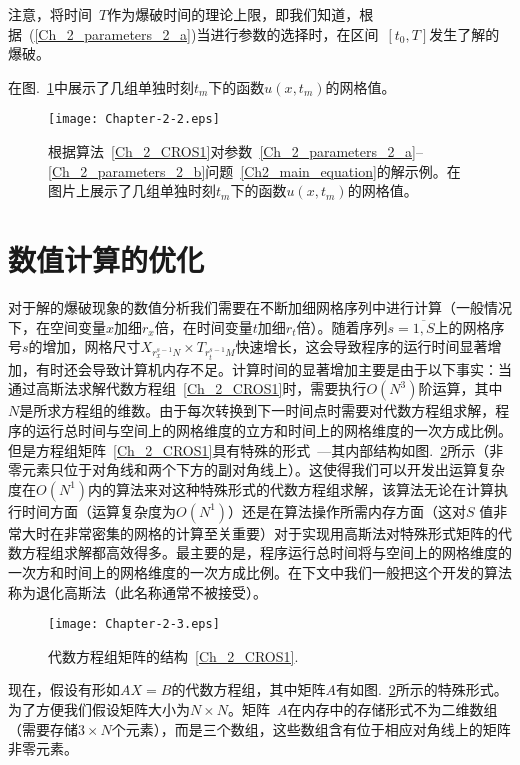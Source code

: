 \documentclass[twoside]{book}
\begin{document}
\begin{CJK*}{GBK}{song}
注意，将时间~$T$作为爆破时间的理论上限，即我们知道，根据~(\ref{Ch_2_parameters_2_a})当进行参数的选择时，在区间~$[t_0,T]$发生了解的爆破。

在图.~\ref{Fig_2_2}中展示了几组单独时刻$t_m$下的函数$u(x,t_m)$的网格值。
\begin{figure}[t]
    \centering
    \texttt{[image: Chapter-2-2.eps]}\\
    \caption{根据算法~\eqref{Ch_2_CROS1}对参数~\eqref{Ch_2_parameters_2_a}--\eqref{Ch_2_parameters_2_b}问题~\eqref{Ch2_main_equation}的解示例。在图片上展示了几组单独时刻$t_m$下的函数$u(x,t_m)$的网格值。}
    \label{Fig_2_2}
\end{figure}



\section{数值计算的优化}

对于解的爆破现象的数值分析我们需要在不断加细网格序列中进行计算（一般情况下，在空间变量$x$加细$r_x$倍，在时间变量$t$加细$r_t$倍）。随着序列$s = \overline{1,S}$上的网格序号$s$的增加，网格尺寸$X_{r_x^{s - 1}N} \times T_{r_t^{s - 1}M}$快速增长，这会导致程序的运行时间显著增加，有时还会导致计算机内存不足。计算时间的显著增加主要是由于以下事实：当通过高斯法求解代数方程组~\eqref{Ch_2_CROS1}时，需要执行$O(N^3)$阶运算，其中$N$是所求方程组的维数。由于每次转换到下一时间点时需要对代数方程组求解，程序的运行总时间与空间上的网格维度的立方和时间上的网格维度的一次方成比例。但是方程组矩阵~\eqref{Ch_2_CROS1}具有特殊的形式~---其内部结构如图.~\ref{Fig_2_3}所示（非零元素只位于对角线和两个下方的副对角线上）。这使得我们可以开发出运算复杂度在$O(N^1)$内的算法来对这种特殊形式的代数方程组求解，该算法无论在计算执行时间方面（运算复杂度为$O(N^1)$）还是在算法操作所需内存方面（这对$S$ 值非常大时在非常密集的网格的计算至关重要）对于实现用高斯法对特殊形式矩阵的代数方程组求解都高效得多。最主要的是，程序运行总时间将与空间上的网格维度的一次方和时间上的网格维度的一次方成比例。在下文中我们一般把这个开发的算法称为退化高斯法（此名称通常不被接受）。
\begin{figure}[t]
    \centering
    \texttt{[image: Chapter-2-3.eps]}\\
    \caption{代数方程组矩阵的结构~\eqref{Ch_2_CROS1}.}
    \label{Fig_2_3}
\end{figure}

\medskip

现在，假设有形如$AX = B$的代数方程组，其中矩阵$A$有如图.~\ref{Fig_2_3}所示的特殊形式。为了方便我们假设矩阵大小为$N \times N$。矩阵~$A$在内存中的存储形式不为二维数组（需要存储$3 \times  N$个元素），而是三个数组，这些数组含有位于相应对角线上的矩阵非零元素。


\end{CJK*}
\end{document}
